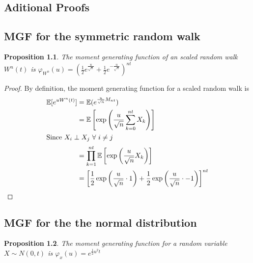\documentclass[11pt]{report}
\newtheorem{proposition}{Proposition}[chapter]
\begin{document}
\begin{appendices}
\makeatletter
{}
\makeatother
  \chapter{Aditional Proofs}
  \section{MGF for the symmetric random walk} \label{proof:mgf_srm}
  \begin{proposition}
  	The moment generating function of an scaled random walk $W^n(t)$ is $\varphi_{W^n}(u) = (\frac{1}{2}e^{\frac{u}{\sqrt{n}}} + \frac{1}{2}e^{-\frac{u}{\sqrt{n}}})^{nt}$
  \end{proposition}
  
  \begin{proof}
  By definition, the moment generating function for a scaled random walk is
  \begin{align*}
  	\mathbb{E}[e^{uW^n(t)}] &= \mathbb{E}(e^{\frac{u}{\sqrt{n}}M_{nt}})\\
  	&= \mathbb{E}\left[\exp\left(\frac{u}{\sqrt{n}}\sum_{k=0}^{nt}X_k\right)\right]\\
  	\shortintertext{Since $X_i \perp X_j \ \forall \ i \neq j$}
  	&= \prod_{k=1}^{nt}\mathbb{E}\left[\exp\left(\frac{u}{\sqrt{n}}X_k\right)\right]\\
  	&= \left[\frac{1}{2}\exp\left(\frac{u}{\sqrt{n}}\cdot 1 \right) + \frac{1}{2}\exp\left(\frac{u}{\sqrt{n}}\cdot -1\right) \right]^{nt}\\
  \end{align*}
  \end{proof}
  
  \section{MGF for the the normal distribution} \label{proof:mgf_nd}
  \begin{proposition}
  	The moment generating function for a random variable $X \sim N(0, t)$ is $\varphi_x(u) = e^{\frac{1}{2}u^2t}$
  \end{proposition}
  

\end{appendices}
\end{document}
